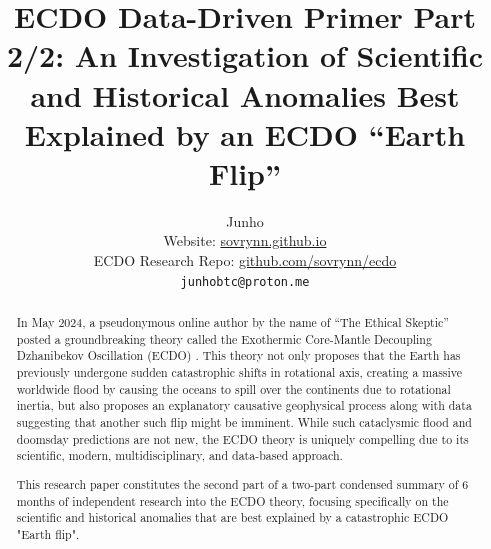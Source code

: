 \documentclass[10pt,twocolumn,letterpaper]{article}
\begin{document}
\title{ECDO Data-Driven Primer Part 2/2: An Investigation of Scientific and Historical Anomalies Best Explained by an ECDO “Earth Flip”}

\author{Junho\\
Website: \href{https://sovrynn.github.io}{sovrynn.github.io}\\
ECDO Research Repo: \href{https://github.com/sovrynn/ecdo}{github.com/sovrynn/ecdo}\\
{\tt\small junhobtc@proton.me}
}

\maketitle

\begin{abstract}
In May 2024, a pseudonymous online author by the name of “The Ethical Skeptic” \cite{0} posted a groundbreaking theory called the Exothermic Core-Mantle Decoupling Dzhanibekov Oscillation (ECDO) \cite{1}. This theory not only proposes that the Earth has previously undergone sudden catastrophic shifts in rotational axis, creating a massive worldwide flood by causing the oceans to spill over the continents due to rotational inertia, but also proposes an explanatory causative geophysical process along with data suggesting that another such flip might be imminent. While such cataclysmic flood and doomsday predictions are not new, the ECDO theory is uniquely compelling due to its scientific, modern, multidisciplinary, and data-based approach.

This research paper constitutes the second part of a two-part condensed summary of 6 months of independent research \cite{2,20} into the ECDO theory, focusing specifically on the scientific and historical anomalies that are best explained by a catastrophic ECDO "Earth flip".

\end{abstract}

\end{document}
